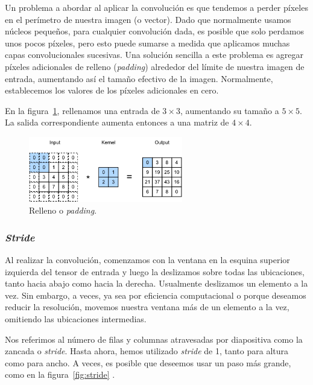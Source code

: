 \documentclass[a4paper,12pt]{article}
\begin{document}
Un problema a abordar al aplicar la convolución es que tendemos a perder píxeles en el perímetro de nuestra imagen (o vector). Dado que normalmente usamos núcleos pequeños, para cualquier convolución dada, es posible que solo perdamos unos pocos píxeles, pero esto puede sumarse a medida que aplicamos muchas capas convolucionales sucesivas. Una solución sencilla a este problema es agregar píxeles adicionales de relleno (\textit{padding}) alrededor del límite de nuestra imagen de entrada, aumentando así el tamaño efectivo de la imagen. Normalmente, establecemos los valores de los píxeles adicionales en cero. \citep{padding}

En la figura~\ref{fig:padding}, rellenamos una entrada de $3 \times 3$, aumentando su tamaño a $5 \times 5$. La salida correspondiente aumenta entonces a una matriz de $4 \times 4$.

\begin{figure}[H]
	\begin{center}				
	\includegraphics[width=0.6\textwidth]{conv-pad.png}
  	\caption{Relleno o \textit{padding}.}
  	\label{fig:padding}
  	\end{center}
\end{figure}

\subsubsection{\textit{Stride}}

Al realizar la convolución, comenzamos con la ventana en la esquina superior izquierda del tensor de entrada y luego la deslizamos sobre todas las ubicaciones, tanto hacia abajo como hacia la derecha. Usualmente deslizamos un elemento a la vez. Sin embargo, a veces, ya sea por eficiencia computacional o porque deseamos reducir la resolución, movemos nuestra ventana más de un elemento a la vez, omitiendo las ubicaciones intermedias.

Nos referimos al número de filas y columnas atravesadas por diapositiva como la zancada o \textit{stride}. Hasta ahora, hemos utilizado \textit{stride} de 1, tanto para altura como para ancho. A veces, es posible que deseemos usar un paso más grande, como en la figura~\ref{fig:stride} \citep{Saha2020Oct}.
\end{document}
